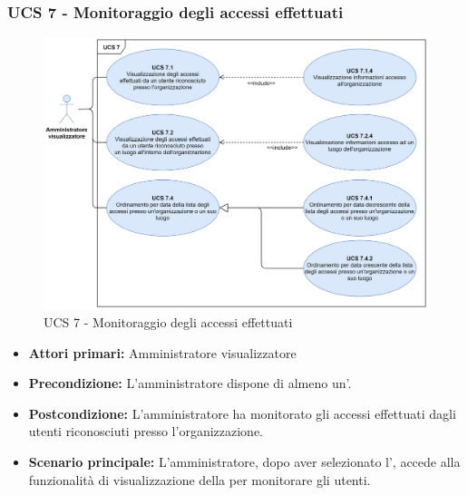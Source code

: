 \subsubsection{UCS 7 - Monitoraggio degli accessi effettuati}

\begin{figure}[h]
	\centering
	\includegraphics[scale=0.5]{Sezioni/UseCase/Immagini/UCS7.png}
	\caption{UCS 7 - Monitoraggio degli accessi effettuati}
\end{figure}

\begin{itemize}
\item \textbf{Attori primari:} Amministratore visualizzatore
\item \textbf{Precondizione:} L'amministratore dispone di almeno un'.
\item \textbf{Postcondizione:} L'amministratore ha monitorato gli accessi effettuati dagli utenti riconosciuti presso l'organizzazione.
\item \textbf{Scenario principale:} L'amministratore, dopo aver selezionato l', accede alla funzionalità di visualizzazione della  per monitorare gli utenti.
\end{itemize}

